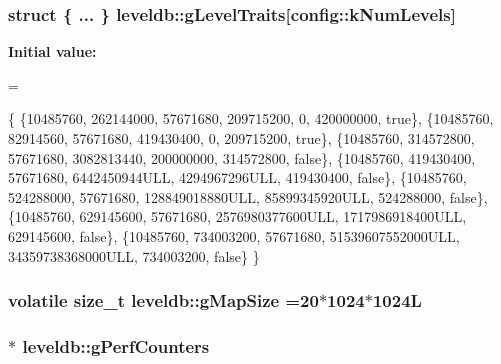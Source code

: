 \subsubsection[{g\+Level\+Traits}]{\setlength{\rightskip}{0pt plus 5cm}struct \{ ... \}   leveldb\+::g\+Level\+Traits\mbox{[}{\bf config\+::k\+Num\+Levels}\mbox{]}\hspace{0.3cm}{\ttfamily [static]}}\label{namespaceleveldb_a97a8ea9d8174264acb8c1cb5f183d8df}
{\bfseries Initial value\+:}
\begin{DoxyCode}
=











\{
    \{10485760,  262144000,  57671680,      209715200,                 0,     420000000, \textcolor{keyword}{true}\},
    \{10485760,   82914560,  57671680,      419430400,                 0,     209715200, \textcolor{keyword}{true}\},
    \{10485760,  314572800,  57671680,     3082813440,         200000000,     314572800, \textcolor{keyword}{false}\},
    \{10485760,  419430400,  57671680,     6442450944ULL,     4294967296ULL,  419430400, \textcolor{keyword}{false}\},
    \{10485760,  524288000,  57671680,   128849018880ULL,    85899345920ULL,  524288000, \textcolor{keyword}{false}\},
    \{10485760,  629145600,  57671680,  2576980377600ULL,  1717986918400ULL,  629145600, \textcolor{keyword}{false}\},
    \{10485760,  734003200,  57671680, 51539607552000ULL, 34359738368000ULL,  734003200, \textcolor{keyword}{false}\}
\}
\end{DoxyCode}
\hypertarget{namespaceleveldb_a3ddc2e41a88b19db841ad0899e40c936}{}
\subsubsection[{g\+Map\+Size}]{\setlength{\rightskip}{0pt plus 5cm}volatile size\+\_\+t leveldb\+::g\+Map\+Size =20$\ast$1024$\ast$1024\+L}\label{namespaceleveldb_a3ddc2e41a88b19db841ad0899e40c936}
\hypertarget{namespaceleveldb_a8aa95dd97d9167fd8c5a015e19e387b8}{}
\subsubsection[{g\+Perf\+Counters}]{ $\ast$ leveldb\+::g\+Perf\+Counters}\label{namespaceleveldb_a8aa95dd97d9167fd8c5a015e19e387b8}
\hypertarget{namespaceleveldb_a2663d2a0f893e7b99a6a70d095c9c817}{}
